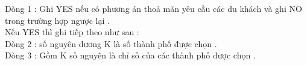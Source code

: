 Dòng 1 : Ghi YES nếu có phương án thoả mãn yêu cầu các du khách và ghi NO trong trường hợp ngược lại .   
\\   Nếu YES thì ghi tiếp theo như sau :   
\\   Dòng 2 : số nguyên dương K là số thành phố được chọn .   
\\   Dòng 3 : Gồm K số nguyên là chỉ số của các thành phố được chọn .  

\